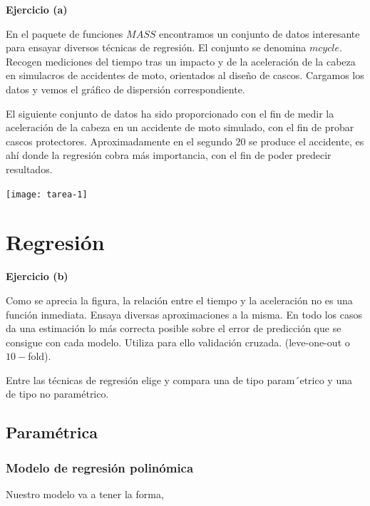 \documentclass[a4paper,12pt]{article}
\newenvironment{exercise}[1]%
{%
  \par\vspace{\baselineskip}\noindent
  \textbf{Ejercicio (#1)}\begin{itshape}%
  \par\vspace{\baselineskip}\noindent\ignorespaces
}%
{%
  \end{itshape}\ignorespacesafterend
}
\begin{document}
\begin{exercise}{a}

En el paquete de funciones $MASS$ encontramos un conjunto de datos interesante
para ensayar diversos t\'ecnicas de regresi\'on. El conjunto se denomina
$mcycle$. Recogen mediciones del tiempo tras un impacto y de la aceleraci\'on
de la cabeza en simulacros de accidentes de moto, orientados al dise\~no de
cascos. Cargamos los datos y vemos el gr\'afico de dispersi\'on correspondiente.

\end{exercise}

\bigskip

El siguiente conjunto de datos ha sido proporcionado con el fin de medir la aceleración de la cabeza en un accidente de moto simulado, con el fin de probar cascos protectores. Aproximadamente en el segundo $20$ se produce el accidente, es ahí donde la regresión cobra más importancia, con el fin de poder predecir resultados.

\texttt{[image: tarea-1]}



\pagebreak

\section{Regresi\'on}


\begin{exercise}{b}
Como se aprecia la figura, la relaci\'on entre el tiempo y la aceleraci\'on
no es una funci\'on inmediata. Ensaya diversas aproximaciones a la misma.
En todo los casos da una estimaci\'on lo m\'as correcta posible sobre el error de
predicci\'on que se consigue con cada modelo. Utiliza para ello validaci\'on cruzada. (leve-one-out o $10-$fold).

Entre las t\'ecnicas de regresi\'on elige y compara
una de tipo param´etrico y una de tipo no param\'etrico.
\end{exercise}


\subsection{Paramétrica}

\subsubsection{Modelo de regresi\'on polin\'omica}

Nuestro modelo va a tener la forma,
\end{document}
